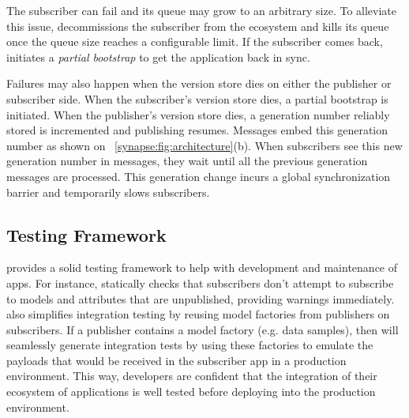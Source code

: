 The subscriber can fail and its queue may grow to an arbitrary size. To
alleviate this issue, \synapse decommissions the subscriber from the
\synapse ecosystem and kills its queue once the queue size reaches a
configurable limit. If the subscriber comes back, \synapse initiates a
{\em partial bootstrap} to get the application back in sync.

Failures may also happen when the version store dies on either the publisher or subscriber
side. When the subscriber's version store dies, a partial bootstrap is initiated. When
the publisher's version store dies, a generation number reliably stored is incremented
and publishing resumes. Messages embed this generation number as shown on
\F~\ref{synapse:fig:architecture}(b). When subscribers see this new generation number
 in messages, they wait until all the previous generation messages are
processed. This generation change incurs a global synchronization barrier and
temporarily slows subscribers.

\subsection{Testing Framework}
\label{synapse:sec:testing}

\synapse provides a solid testing framework to help with development and
maintenance of apps.  For instance, \synapse statically checks that subscribers
don't attempt to subscribe to models and attributes that are unpublished,
providing warnings immediately. \synapse also simplifies integration testing by
reusing model factories from publishers on subscribers.  If a publisher
contains a model factory (e.g. data samples), then \synapse will seamlessly
generate integration tests by using these factories to emulate the payloads that
would be received in the subscriber app in a production environment.  This way,
developers are confident that the integration of their ecosystem of applications
is well tested before deploying into the production environment.

